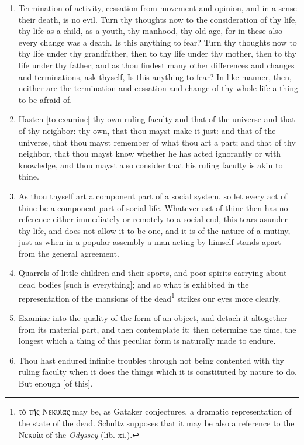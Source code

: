 \begin{enumerate}
\item Termination of activity, cessation from movement and opinion, and in a sense their death, is no evil. Turn thy thoughts now to the consideration of thy life, thy life as a child, as a youth, thy manhood, thy old age, for in these also every change was a death. Is this anything to fear? Turn thy thoughts now to thy life under thy grandfather, then to thy life under thy mother, then to thy life under thy father; and as thou findest many other differences and changes and terminations, ask thyself, Is this anything to fear? In like manner, then, neither are the termination and cessation and change of thy whole life a thing to be afraid of.

\item Hasten [{\clarify to examine}] thy own ruling faculty and that of the universe and that of thy neighbor: thy own, that thou mayst make it just: and that of the universe, that thou mayst remember of what thou art a part; and that of thy neighbor, that thou mayst know whether he has acted ignorantly or with knowledge, and thou mayst also consider that his ruling faculty is akin to thine.

\item As thou thyself art a component part of a social system, so let every act of thine be a component part of social life. Whatever act of thine then has no reference either immediately or remotely to a social end, this tears asunder thy life, and does not allow it to be one, and it is of the nature of a mutiny, just as when in a popular assembly a man acting by himself stands apart from the general agreement.

\item Quarrels of little children and their sports, and poor spirits carrying about dead bodies [{\clarify such is everything}]; and so what is exhibited in the representation of the mansions of the dead\footnote{\textgreek{τὸ τῆς Νεκυίας} may be, as Gataker conjectures, a dramatic representation of the state of the dead. Schultz supposes that it may be also a reference to the \textgreek{Νεκυία} of the \textit{Odyssey} (lib. xi.).} strikes our eyes more clearly.

\item Examine into the quality of the form of an object, and detach it altogether from its material part, and then contemplate it; then determine the time, the longest which a thing of this peculiar form is naturally made to endure.

\item Thou hast endured infinite troubles through not being contented with thy ruling faculty when it does the things which it is constituted by nature to do. But enough [{\clarify of this}].


\end{enumerate}
